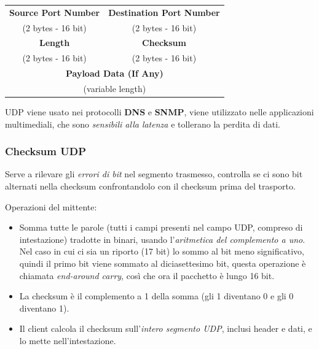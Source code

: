 \begin{center}
  \begin{tabular}{|c|c|c|}
    \hline
    \multicolumn{2}{|c|}{\textbf{Source Port Number}} & \multicolumn{1}{c|}{\textbf{Destination Port Number}} \\
    \multicolumn{2}{|c|}{(2 bytes - 16 bit)} & \multicolumn{1}{c|}{(2 bytes - 16 bit)} \\ \hline
    \multicolumn{2}{|c|}{\textbf{Length}} & \multicolumn{1}{c|}{\textbf{Checksum}} \\
    \multicolumn{2}{|c|}{(2 bytes - 16 bit)} & \multicolumn{1}{c|}{(2 bytes - 16 bit)} \\ \hline
    \multicolumn{3}{|c|}{\textbf{Payload Data (If Any)}} \\
    \multicolumn{3}{|c|}{(variable length)} \\ \hline
  \end{tabular}
\hspace{0.5cm}
\end{center}

UDP viene usato nei protocolli \textbf{DNS} e \textbf{SNMP}, viene utilizzato nelle applicazioni multimediali, che sono \textit{sensibili alla latenza} e tollerano la perdita di dati.

\subsubsection*{Checksum UDP}

Serve a rilevare gli \textit{errori di bit} nel segmento trasmesso, controlla se ci sono bit alternati nella checksum confrontandolo con il checksum prima del trasporto.

Operazioni del mittente:
\begin{itemize}
  \item Somma tutte le parole (tutti i campi presenti nel campo UDP, compreso di intestazione) tradotte in binari, usando l'\textit{aritmetica del complemento a uno}. Nel caso in cui ci sia un riporto (17 bit) lo sommo al bit meno significativo, quindi il primo bit viene sommato al diciasettesimo bit, questa operazione è chiamata \textit{end-around carry}, così che ora il pacchetto è lungo 16 bit.
  \item La checksum è il complemento a 1 della somma (gli 1 diventano 0 e gli 0 diventano 1).
  \item Il client calcola il checksum sull'\textit{intero segmento UDP}, inclusi header e dati, e lo mette nell'intestazione.
\end{itemize}

